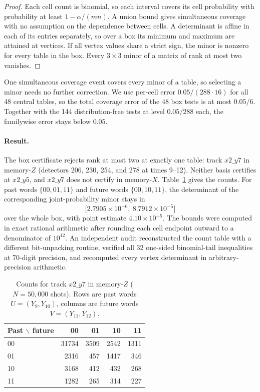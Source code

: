 \documentclass[11pt]{article}
\begin{document}
\begin{proof}
Each cell count is binomial, so each interval covers its cell probability with probability at least $1-\alpha/(mn)$. A union bound gives simultaneous coverage with no assumption on the dependence between cells. A determinant is affine in each of its entries separately, so over a box its minimum and maximum are attained at vertices. If all vertex values share a strict sign, the minor is nonzero for every table in the box. Every $3\times3$ minor of a matrix of rank at most two vanishes.
\end{proof}

One simultaneous coverage event covers every minor of a table, so selecting a minor needs no further correction. We use per-cell error $0.05/(288\cdot16)$ for all 48 central tables, so the total coverage error of the 48 box tests is at most $0.05/6$. Together with the 144 distribution-free tests at level $0.05/288$ each, the familywise error stays below $0.05$.

\paragraph{Result.} The box certificate rejects rank at most two at exactly one table: track $x2\_y7$ in memory-$Z$ (detectors 206, 230, 254, and 278 at times 9--12). Neither basis certifies at $x2\_y5$, and $x2\_y7$ does not certify in memory-$X$. Table~\ref{tab:x2y7} gives the counts. For past words $\{00,01,11\}$ and future words $\{00,10,11\}$, the determinant of the corresponding joint-probability minor stays in
\begin{equation}
    \bigl[2.7905\times10^{-6},\ 8.7912\times10^{-5}\bigr]
    \label{eq:boxdet}
\end{equation}
over the whole box, with point estimate $4.10\times10^{-5}$. The bounds were computed in exact rational arithmetic after rounding each cell endpoint outward to a denominator of $10^{12}$. An independent audit reconstructed the count table with a different bit-unpacking routine, verified all 32 one-sided binomial-tail inequalities at 70-digit precision, and recomputed every vertex determinant in arbitrary-precision arithmetic.

\begin{table}[H]
\centering
\caption{Counts for track $x2\_y7$ in memory-$Z$ ($N=50{,}000$ shots). Rows are past words $U=(Y_9,Y_{10})$, columns are future words $V=(Y_{11},Y_{12})$.}
\label{tab:x2y7}
\begin{tabular}{lrrrr}
\toprule
Past $\backslash$ future & 00 & 01 & 10 & 11\\
\midrule
00 & 31734 & 3509 & 2542 & 1311\\
01 & 2316 & 457 & 1417 & 346\\
10 & 3168 & 412 & 432 & 268\\
11 & 1282 & 265 & 314 & 227\\
\bottomrule
\end{tabular}
\end{table}
\end{document}
